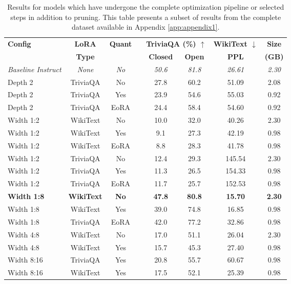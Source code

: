 {\scriptsize
\begin{table}[htbp]
\centering
\scriptsize
\caption[Results for Complete Pipeline Configurations (Subset)]{Results for models which have undergone the complete optimization pipeline or selected steps in addition to pruning. This table presents a subset of results from the complete dataset available in Appendix \ref{app:appendix1}.} \label{tab:complete_pipeline_results}
\begin{tabular}{lcclcccc}
\hline
\textbf{Config} & \textbf{LoRA} & \textbf{Quant} & & \multicolumn{2}{c}{\textbf{TriviaQA (\%) $\uparrow$}} & \textbf{WikiText $\downarrow$} & \textbf{Size} \\
\cline{5-6}
& \textbf{Type} & & & \textbf{Closed} & \textbf{Open} & \textbf{PPL} & \textbf{(GB)} \\
\hline
\textit{Baseline Instruct} & \textit{None} & \textit{No} & & \textit{50.6} & \textit{81.8} & \textit{26.61} & \textit{2.30} \\
Depth 2 & TriviaQA & No & & 27.8 & 60.2 & 51.09 & 2.08 \\
Depth 2 & TriviaQA & Yes & & 23.9 & 54.6 & 55.03 & 0.92 \\
Depth 2 & TriviaQA & EoRA & & 24.4 & 58.4 & 54.60 & 0.92 \\
Width 1:2 & WikiText & No & & 10.0 & 32.0 & 40.26 & 2.30 \\
Width 1:2 & WikiText & Yes & & 9.1 & 27.3 & 42.19 & 0.98 \\
Width 1:2 & WikiText & EoRA & & 8.8 & 28.3 & 41.78 & 0.98 \\
Width 1:2 & TriviaQA & No & & 12.4 & 29.3 & 145.54 & 2.30 \\
Width 1:2 & TriviaQA & Yes & & 11.3 & 26.5 & 154.33 & 0.98 \\
Width 1:2 & TriviaQA & EoRA & & 11.7 & 25.7 & 152.53 & 0.98 \\
\textbf{Width 1:8} & \textbf{WikiText} & \textbf{No} & & \textbf{47.8} & \textbf{80.8} & \textbf{15.70} & \textbf{2.30} \\
Width 1:8 & WikiText & Yes & & 39.0 & 74.8 & 16.85 & 0.98 \\
Width 1:8 & TriviaQA & EoRA & & 42.0 & 77.2 & 32.86 & 0.98 \\
Width 4:8 & WikiText & No & & 17.0 & 51.1 & 26.04 & 2.30 \\
Width 4:8 & WikiText & Yes & & 15.7 & 45.3 & 27.40 & 0.98 \\
Width 8:16 & TriviaQA & Yes & & 20.8 & 55.7 & 60.67 & 0.98 \\
Width 8:16 & WikiText & Yes & & 17.5 & 52.1 & 25.39 & 0.98 \\

\end{tabular}
\end{table}}
